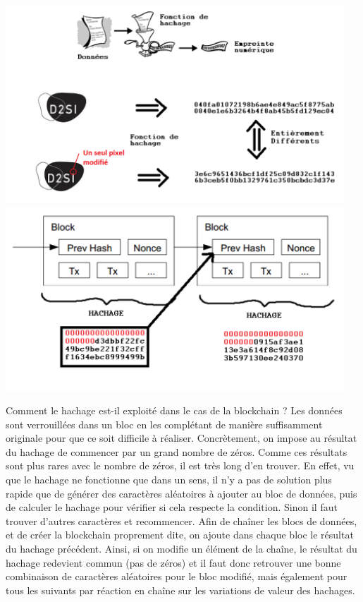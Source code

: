 \documentclass[11pt,twoside,a4paper]{article}
\begin{document}
\begin{minipage}[h]{0.49\textwidth}
	\includegraphics[width=0.95\textwidth]{img/d2si_blog_image_blockchain_hachage1.png}~\\
	\includegraphics[width=0.95\textwidth]{img/d2si_blog_image_blockchain_chainage.png}
\end{minipage} \hfill \begin{minipage}[h]{0.50\textwidth}
	Comment le hachage est-il exploit{\'e} dans le cas de la blockchain ? Les donn{\'e}es sont verrouill{\'e}es dans un bloc en les compl{\'e}tant de mani{\`e}re suffisamment originale pour que ce soit difficile {\`a} r{\'e}aliser. Concr{\`e}tement, on impose au r{\'e}sultat du hachage de commencer par un grand nombre de z{\'e}ros. Comme ces r{\'e}sultats sont plus rares avec le nombre de z{\'e}ros, il est tr{\`e}s long d'en trouver. En effet, vu que le hachage ne fonctionne que dans un sens, il n'y a pas de solution plus rapide que de g{\'e}n{\'e}rer des caract{\`e}res al{\'e}atoires {\`a} ajouter au bloc de donn{\'e}es, puis de calculer le hachage pour v{\'e}rifier si cela respecte la condition. Sinon il faut trouver d'autres caract{\`e}res et recommencer. Afin de cha{\^i}ner les blocs de donn{\'e}es, et de cr{\'e}er la blockchain proprement dite, on ajoute dans chaque bloc le r{\'e}sultat du hachage pr{\'e}c{\'e}dent. Ainsi, si on modifie un {\'e}l{\'e}ment de la cha{\^i}ne, le r{\'e}sultat du hachage redevient commun (pas de z{\'e}ros) et il faut donc retrouver une bonne combinaison de caract{\`e}res al{\'e}atoires pour le bloc modifi{\'e}, mais {\'e}galement pour tous les suivants par r{\'e}action en cha{\^i}ne sur les variations de valeur des hachages.~\\
\end{minipage}
\end{document}
